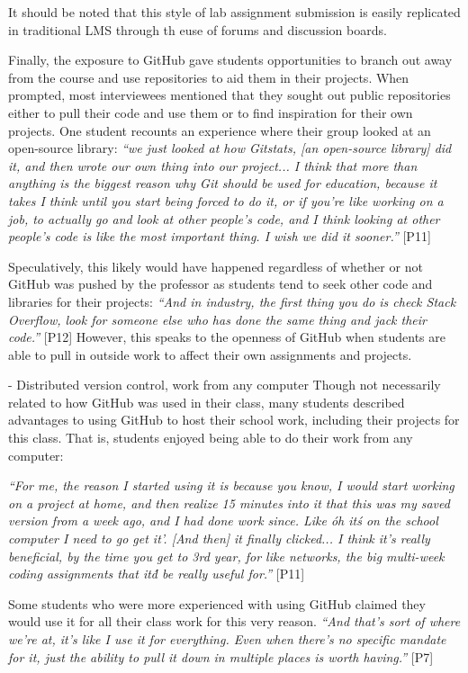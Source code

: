 It should be noted that this style of lab assignment submission is easily replicated in traditional LMS through th euse of forums and discussion boards. %

Finally, the exposure to GitHub gave students opportunities to branch out away from the course and use repositories to aid them in their projects. When prompted, most interviewees mentioned that they sought out public repositories either to pull their code and use them or to find inspiration for their own projects. One student recounts an experience where their group looked at an open-source library: \textit{``we just looked at how Gitstats, [an open-source library] did it, and then wrote our own thing into our project... I think that more than anything is the biggest reason why Git should be used for education, because it takes I think until you start being forced to do it, or if you're like working on a job, to actually go and look at other people's code, and I think looking at other people's code is like the most important thing. I wish we did it sooner.''} [P11]

Speculatively, this likely would have happened regardless of whether or not GitHub was pushed by the professor as students tend to seek other code and libraries for their projects: \textit{``And in industry, the first thing you do is check Stack Overflow, look for someone else who has done the same thing and jack their code.''} [P12] However, this speaks to the openness of GitHub when students are able to pull in outside work to affect their own assignments and projects.

- Distributed version control, work from any computer
Though not necessarily related to how GitHub was used in their class, many students described advantages to using GitHub to host their school work, including their projects for this class. That is, students enjoyed being able to do their work from any computer:

\textit{``For me, the reason I started using it is because you know, I would start working on a project at home, and then realize 15 minutes into it that this was my saved version from a week ago, and I had done work since. Like \'oh it\'s on the school computer I need to go get it'. [And then] it finally clicked... I think it's really beneficial, by the time you get to 3rd year, for like networks, the big multi-week coding assignments that it\'d be really useful for.''} [P11]

Some students who were more experienced with using GitHub claimed they would use it for all their class work for this very reason. \textit{``And that's sort of where we're at, it's like I use it for everything. Even when there's no specific mandate for it, just the ability to pull it down in multiple places is worth having.''} [P7]

